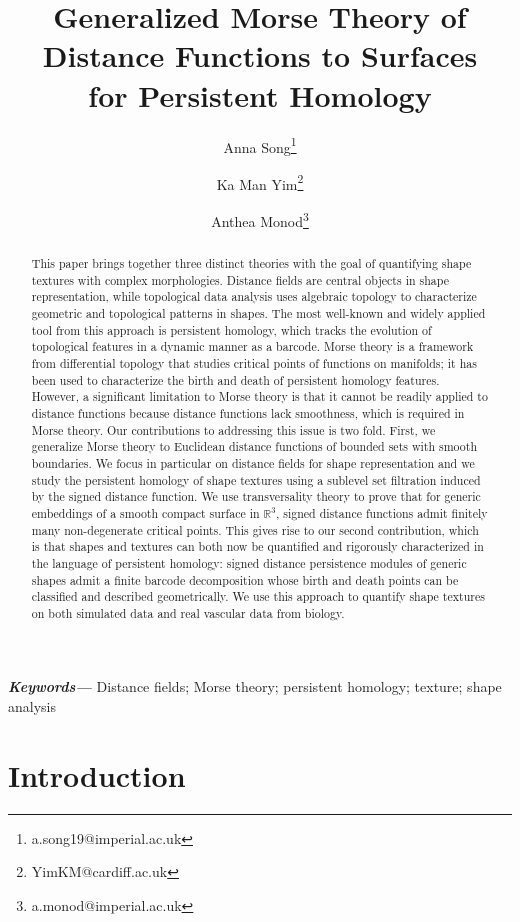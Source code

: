 \documentclass[11pt]{article}
\title{Generalized Morse Theory of Distance Functions to Surfaces\\ for Persistent Homology}
\author[1,2]{Anna Song\thanks{a.song19@imperial.ac.uk}}
\author[3]{Ka Man Yim\thanks{YimKM@cardiff.ac.uk}}
\author[1]{Anthea Monod\thanks{a.monod@imperial.ac.uk}}
\affil[1]{\small Department of Mathematics, Imperial College London, London, UK}
\affil[2]{\small Haematopoietic Stem Cell Laboratory, The Francis Crick Institute, London, UK}
\affil[3]{\small School of Mathematics, Cardiff University, Cardiff, UK}
\newcommand{\R}{\mathbb{R}}
\theoremstyle{plain}
\theoremstyle{definition}
\theoremstyle{remark}
\providecommand{\keywords}[1]{\textbf{\textit{Keywords---}} #1}
\begin{document}
	

\maketitle

\begin{abstract}
This paper brings together three distinct theories with the goal of quantifying shape textures with complex morphologies. Distance fields are central objects in shape representation, while topological data analysis uses algebraic topology to characterize geometric and topological patterns in shapes. The most well-known and widely applied tool from this approach is persistent homology, which tracks the evolution of topological features in a dynamic manner as a barcode.  Morse theory is a framework from differential topology that studies critical points of functions on manifolds; it has been used to characterize the birth and death of persistent homology features. However, a significant limitation to Morse theory is that it cannot be readily applied to distance functions because distance functions lack smoothness, which is required in Morse theory. Our contributions to addressing this issue is two fold. First, we generalize Morse theory to Euclidean distance functions of bounded sets with smooth boundaries. We focus in particular on distance fields for shape representation and we study the persistent homology of shape textures using a sublevel set filtration induced by the signed distance function. We use transversality theory to prove that for generic embeddings of a smooth compact surface in $\R^3$, signed distance functions admit finitely many non-degenerate critical points.  This gives rise to our second contribution, which is that shapes and textures can both now be quantified and rigorously characterized in the language of persistent homology: signed distance persistence modules of generic shapes admit a finite barcode decomposition whose birth and death points can be classified and described geometrically. We use this approach to quantify shape textures on both simulated data and real vascular data from biology.
\end{abstract}
	
\keywords{Distance fields; Morse theory; persistent homology; texture; shape analysis}
	
\vfill\eject


\tableofcontents


\section{Introduction} \label{sec:intro}
\end{document}
